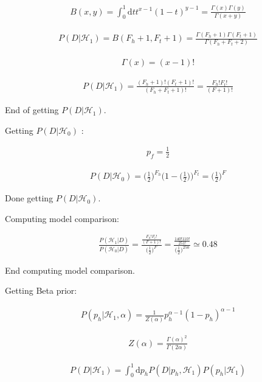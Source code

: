 \documentclass[12pt]{article}
\begin{document}
\begin{gather}
B(x,y) = \int_0^1 \! \mathrm{d}t t^{x-1}(1-t)^{y-1} = \frac{\Gamma(x)\Gamma(y)}{\Gamma(x+y)}
\end{gather}

\begin{gather}
P(D|\mathcal{H}_1) = B(F_h+1,F_t+1) = \frac{\Gamma(F_h+1)\Gamma(F_t+1)}{\Gamma(F_h+F_t+2)}
\end{gather}

\begin{gather}
\Gamma(x) = (x-1)!
\end{gather}

\begin{gather}
P(D|\mathcal{H}_1) = \frac{(F_h+1)!(F_t+1)!}{(F_h+F_t+1)!} = \frac{F_h!F_t!}{(F+1)!}
\end{gather}

End of getting $P(D|\mathcal{H}_1)$.

Getting $P(D|\mathcal{H}_0)$ :

\begin{gather}
p_f = \frac{1}{2}
\end{gather}

\begin{gather}
P(D|\mathcal{H}_0) = \Big(\frac{1}{2}\Big)^{F_h}\Big(1 - \Big(\frac{1}{2}\Big)\Big)^{F_t} = \Big(\frac{1}{2}\Big)^{F}
\end{gather}


Done getting $P(D|\mathcal{H}_0)$.

Computing model comparison:

\begin{gather}
\frac{P(\mathcal{H}_1 | D)}{P(\mathcal{H}_0 | D)} = \frac{\frac{F_h!F_t!}{(F+1)!}}{\Big(\frac{1}{2}\Big)^{F}} =  \frac{\frac{140!110!}{251!}}{\Big(\frac{1}{2}\Big)^{250}} \simeq 0.48
\end{gather}

End computing model comparison.

Getting Beta prior:

\begin{gather}
P(p_h|\mathcal{H}_1,\alpha) = \frac{1}{Z(\alpha)}   p_h^{\alpha-1}(1-p_h)^{\alpha-1}
\end{gather}

\begin{gather}
Z(\alpha) = \frac{\Gamma(\alpha)^2}{\Gamma(2\alpha)}
\end{gather}

\begin{gather}
P(D|\mathcal{H}_1) = \int_0^1 \! \mathrm{d}p_h P(D|p_h,\mathcal{H}_1)P(p_h|\mathcal{H}_1)
\end{gather}
\end{document}
